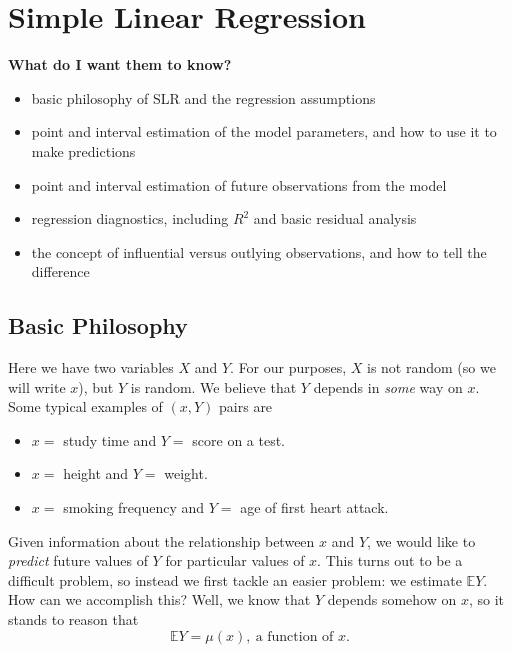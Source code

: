 \chapter{Simple Linear Regression}
\label{sec-11}

\textbf{What do I want them to know?}

\begin{itemize}
\item basic philosophy of SLR and the regression assumptions
\item point and interval estimation of the model parameters, and how to
use it to make predictions
\item point and interval estimation of future observations from the model
\item regression diagnostics, including \( R^{2} \) and basic residual
analysis
\item the concept of influential versus outlying observations, and how to
tell the difference
\end{itemize}

\section{Basic Philosophy}
\label{sec-11-1}

Here we have two variables \(X\) and \(Y\). For our purposes, \(X\) is
not random (so we will write \(x\)), but \(Y\) is random. We believe
that \(Y\) depends in \emph{some} way on \(x\). Some typical examples of \(
(x,Y) \) pairs are

\begin{itemize}
\item \( x = \) study time and \( Y = \) score on a test.
\item \( x = \) height and \( Y = \) weight.
\item \( x = \) smoking frequency and \( Y = \) age of first heart attack.
\end{itemize}

Given information about the relationship between \(x\) and \(Y\), we
would like to \emph{predict} future values of \(Y\) for particular values
of \(x\). This turns out to be a difficult problem, so
instead we first tackle an easier problem: we estimate \( \mathbb{E} Y
\). How can we accomplish this? Well, we know that \(Y\) depends
somehow on \(x\), so it stands to reason that
\begin{equation}
\mathbb{E} Y = \mu(x),\ \mbox{a function of }x.
\end{equation}

